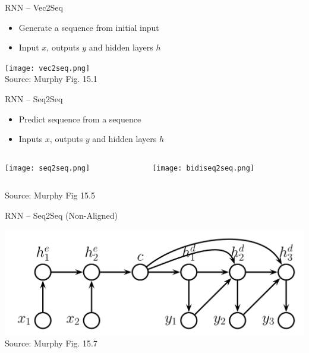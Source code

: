 \documentclass[ignorenonframetext,xcolor=x11names]{beamer}
\begin{document}
\begin{frame}{RNN -- Vec2Seq}
\begin{itemize}
   \item Generate a sequence from initial input
   \item Input $x$, outputs $y$ and hidden layers $h$
\end{itemize}
\centering

\texttt{[image: vec2seq.png]} \\

\scriptsize Source: Murphy Fig. 15.1
\end{frame}

\begin{frame}{RNN -- Seq2Seq}
\begin{itemize}
    \item Predict sequence from a sequence
    \item Inputs $x$, outputs $y$ and hidden layers $h$
\end{itemize}
\centering
\begin{columns}
\begin{column}{.45\textwidth}
\centering

\texttt{[image: seq2seq.png]} 
\end{column}
\begin{column}{.45\textwidth}
\centering

\texttt{[image: bidiseq2seq.png]}
\end{column}
\end{columns}

\scriptsize Source: Murphy Fig 15.5
\end{frame}

\begin{frame}{RNN -- Seq2Seq (Non-Aligned)}

\centering
\includegraphics[width=\textwidth]{seq2seq_nonaligned.png} \\

\scriptsize Source: Murphy Fig. 15.7
\end{frame}
\end{document}
